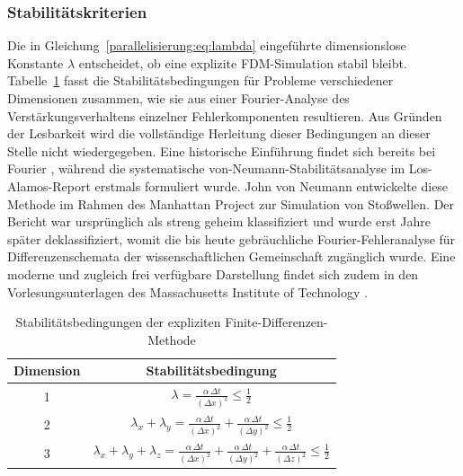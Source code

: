 \subsubsection{Stabilitätskriterien}

Die in Gleichung~\eqref{parallelisierung:eq:lambda} eingeführte dimensionslose Konstante \(\lambda\) entscheidet, 
ob eine explizite FDM-Simulation stabil bleibt.  
Tabelle~\ref{parallelisierung:tab:stabilitaet_fdm} fasst die Stabilitätsbedingungen für Probleme verschiedener 
Dimensionen zusammen, wie sie aus einer Fourier-Analyse des Verstärkungsverhaltens einzelner Fehlerkomponenten 
resultieren.  
Aus Gründen der Lesbarkeit wird die vollständige Herleitung dieser Bedingungen an 
dieser Stelle nicht wiedergegeben.
Eine historische Einführung findet sich bereits bei Fourier \cite{parallelisierung:fourier1822}, während die systematische von-Neumann-Stabilitätsanalyse im Los-Alamos-Report \cite{parallelisierung:vonneumann1950} erstmals formuliert wurde. John von Neumann entwickelte diese Methode im Rahmen des Manhattan Project zur Simulation von Stoßwellen. Der Bericht war ursprünglich als streng geheim klassifiziert und wurde erst Jahre später deklassifiziert, womit die bis heute gebräuchliche Fourier-Fehleranalyse für Differenzenschemata der wissenschaftlichen Gemeinschaft zugänglich wurde. Eine moderne und zugleich frei verfügbare Darstellung findet sich zudem in den Vorlesungsunterlagen des Massachusetts Institute of Technology \cite{parallelisierung:MITnotes}.

\label{parallelisierung:sec:stabilitaetskriterien}

\begin{table}
	\centering
	\caption{Stabilitätsbedingungen der expliziten Finite-Differenzen-Methode}
	\label{parallelisierung:tab:stabilitaet_fdm}
	\begin{tabular}{|c|c|}
		\hline
		\textbf{Dimension} & \textbf{Stabilitätsbedingung} \\
		\hline
		1 & 
		\( \displaystyle \lambda = \frac{\alpha \, \Delta t}{(\Delta x)^2} \leq \frac{1}{2} \) \\
		\hline
		2 & 
		\( \displaystyle \lambda_x + \lambda_y =
		\frac{\alpha \, \Delta t}{(\Delta x)^2} +
		\frac{\alpha \, \Delta t}{(\Delta y)^2} \leq \frac{1}{2} \) \\
		\hline
		3 & 
		\( \displaystyle \lambda_x + \lambda_y + \lambda_z =
		\frac{\alpha \, \Delta t}{(\Delta x)^2} +
		\frac{\alpha \, \Delta t}{(\Delta y)^2} +
		\frac{\alpha \, \Delta t}{(\Delta z)^2} \leq \frac{1}{2} \) \\
		\hline
	\end{tabular}
\end{table}



